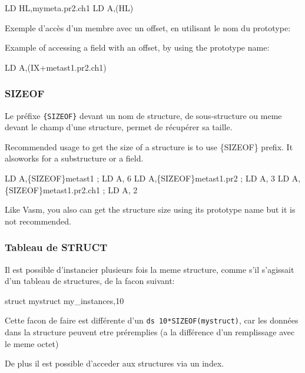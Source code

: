 \begin{code}
LD HL,mymeta.pr2.ch1
LD A,(HL)
\end{code}

\begin{xfr}
Exemple d'accès d'un membre avec un offset, en utilisant le nom du prototype:
\end{xfr}
\begin{xen}
Example of accessing a field with an offset, by using the prototype name:
\end{xen}

\begin{code}
LD A,(IX+metast1.pr2.ch1)
\end{code}

    


\subsubsection{SIZEOF}

\begin{xfr}
  Le préfixe \texttt{\{SIZEOF\}} devant un nom de structure, de sous-structure ou meme devant le champ d'une structure, permet de récupérer sa taille.
\end{xfr}

\begin{xen}
Recommended usage to get the size of a structure is to use \{SIZEOF\} prefix.
It alsoworks for a substructure or a field.
\end{xen}

\begin{code}
  LD A,\{SIZEOF\}metast1              ; LD A, 6
  LD A,\{SIZEOF\}metast1.pr2          ; LD A, 3
  LD A,\{SIZEOF\}metast1.pr2.ch1      ; LD A, 2
\end{code}

\begin{xen}
Like Vasm, you also can get the structure size using its prototype name but it is not recommended.
\end{xen}



\begin{xfr}
    \subsubsection{Tableau de STRUCT}

Il est possible d'instancier plusieurs fois la meme structure, comme s'il s'agissait d'un tableau de structures, de la facon suivant:

\begin{code}
    struct mystruct my_instances,10
\end{code}

Cette facon de faire est différente d'un \texttt{ds 10*SIZEOF(mystruct)}, car les données dans la structure peuvent etre préremplies (a la différence d'un remplissage avec le meme octet)

De plus il est possible d'acceder aux structures via un index.
    
\end{xfr}
    